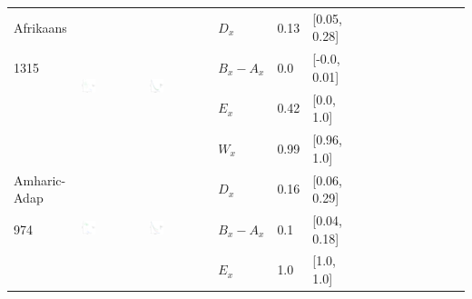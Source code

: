 \documentclass[11pt,letterpaper]{article}
\begin{document}
\begin{longtable}{lllllllllllllll}
Afrikaans  &  \multirow{4}{*}{\includegraphics[width=0.25\textwidth]{figures/Afrikaans-entropy-memory.pdf}}  &  \multirow{4}{*}{\includegraphics[width=0.25\textwidth]{figures/Afrikaans-listener-surprisal-memory.pdf}}  &  $D_x$  &  0.13  &  [0.05, 0.28]  \\ 
1315  &    &    &  $B_x-A_x$  &  0.0  &  [-0.0, 0.01]  \\ 
  &    &    &  $E_x$  &  0.42  &  [0.0, 1.0]  \\ 
  &    &    &  $W_x$  &  0.99  &  [0.96, 1.0]  \\ [10.25ex] \hline
Amharic-Adap  &  \multirow{4}{*}{\includegraphics[width=0.25\textwidth]{figures/Amharic-Adap-entropy-memory.pdf}}  &  \multirow{4}{*}{\includegraphics[width=0.25\textwidth]{figures/Amharic-Adap-listener-surprisal-memory.pdf}}  &  $D_x$  &  0.16  &  [0.06, 0.29]  \\ 
974  &    &    &  $B_x-A_x$  &  0.1  &  [0.04, 0.18]  \\ 
  &    &    &  $E_x$  &  1.0  &  [1.0, 1.0]  \\ 

\end{longtable}
\end{document}
